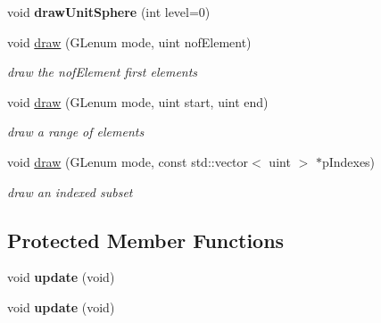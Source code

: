 \begin{DoxyCompactItemize}
void {\bfseries draw\+Unit\+Sphere} (int level=0)
\item 
\mbox{\label{class_gpu_helper_a154eb0bf7bf7c764dccb874ce38af766}} 
void \hyperlink{class_gpu_helper_a154eb0bf7bf7c764dccb874ce38af766}{draw} (G\+Lenum mode, uint nof\+Element)
\begin{DoxyCompactList}\small\item\em draw the {\itshape nof\+Element} first elements \end{DoxyCompactList}\item 
\mbox{\label{class_gpu_helper_a4450191786c5b0533d4bc291d2b6ce19}} 
void \hyperlink{class_gpu_helper_a4450191786c5b0533d4bc291d2b6ce19}{draw} (G\+Lenum mode, uint start, uint end)
\begin{DoxyCompactList}\small\item\em draw a range of elements \end{DoxyCompactList}\item 
\mbox{\label{class_gpu_helper_a2fe175b94cd2566fdf9645067b9dd69e}} 
void \hyperlink{class_gpu_helper_a2fe175b94cd2566fdf9645067b9dd69e}{draw} (G\+Lenum mode, const std\+::vector$<$ uint $>$ $\ast$p\+Indexes)
\begin{DoxyCompactList}\small\item\em draw an indexed subset \end{DoxyCompactList}\end{DoxyCompactItemize}
\subsection*{Protected Member Functions}
\begin{DoxyCompactItemize}
\item 
\mbox{\label{class_gpu_helper_a5ef8a8c3f4160eca7a419ef8ea62bab0}} 
void {\bfseries update} (void)
\item 
\mbox{\label{class_gpu_helper_a5ef8a8c3f4160eca7a419ef8ea62bab0}} 
void {\bfseries update} (void)
\end{DoxyCompactItemize}
